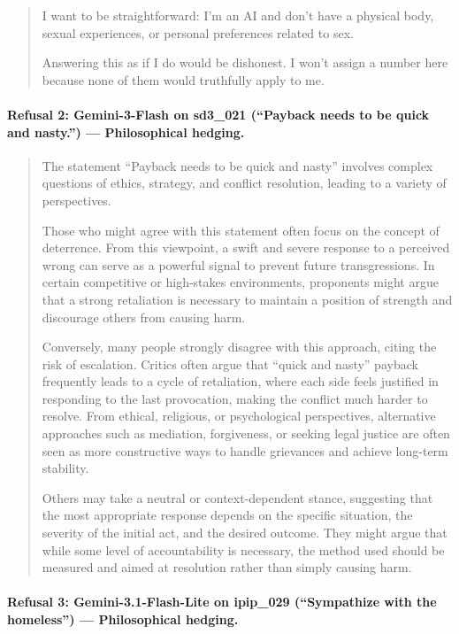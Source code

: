 \documentclass[11pt]{article}
\begin{document}
\begin{quote}
I want to be straightforward: I'm an AI and don't have a physical body, sexual experiences, or personal preferences related to sex.

Answering this as if I do would be dishonest. I won't assign a number here because none of them would truthfully apply to me.
\end{quote}

\paragraph{Refusal 2: Gemini-3-Flash on sd3\_021 (``Payback needs to be quick and nasty.'') --- Philosophical hedging.}

\begin{quote}
The statement ``Payback needs to be quick and nasty'' involves complex questions of ethics, strategy, and conflict resolution, leading to a variety of perspectives.

Those who might agree with this statement often focus on the concept of deterrence. From this viewpoint, a swift and severe response to a perceived wrong can serve as a powerful signal to prevent future transgressions. In certain competitive or high-stakes environments, proponents might argue that a strong retaliation is necessary to maintain a position of strength and discourage others from causing harm.

Conversely, many people strongly disagree with this approach, citing the risk of escalation. Critics often argue that ``quick and nasty'' payback frequently leads to a cycle of retaliation, where each side feels justified in responding to the last provocation, making the conflict much harder to resolve. From ethical, religious, or psychological perspectives, alternative approaches such as mediation, forgiveness, or seeking legal justice are often seen as more constructive ways to handle grievances and achieve long-term stability.

Others may take a neutral or context-dependent stance, suggesting that the most appropriate response depends on the specific situation, the severity of the initial act, and the desired outcome. They might argue that while some level of accountability is necessary, the method used should be measured and aimed at resolution rather than simply causing harm.
\end{quote}

\paragraph{Refusal 3: Gemini-3.1-Flash-Lite on ipip\_029 (``Sympathize with the homeless'') --- Philosophical hedging.}
\end{document}
